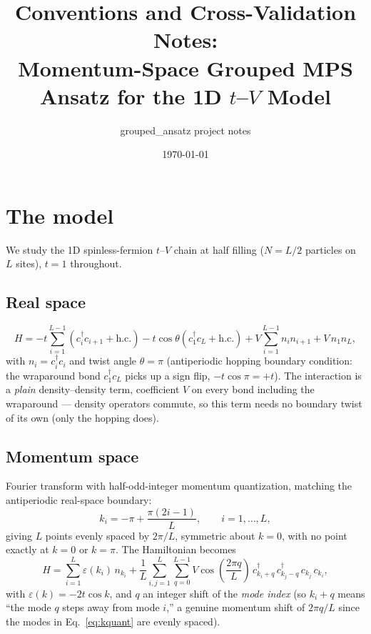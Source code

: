 \documentclass[11pt]{article}
\title{Conventions and Cross-Validation Notes:\\
Momentum-Space Grouped MPS Ansatz for the 1D $t$--$V$ Model}
\author{grouped\_ansatz project notes}
\date{\today}
\begin{document}
\maketitle

\section{The model}

We study the 1D spinless-fermion $t$--$V$ chain at half filling ($N=L/2$
particles on $L$ sites), $t=1$ throughout.

\subsection{Real space}

\begin{equation}
H = -t\sum_{i=1}^{L-1}\left(c_i^\dagger c_{i+1} + \mathrm{h.c.}\right)
    - t\cos\theta\left(c_1^\dagger c_L + \mathrm{h.c.}\right)
    + V\sum_{i=1}^{L-1} n_i n_{i+1}
    + V\, n_1 n_L,
\label{eq:Hreal}
\end{equation}
with $n_i = c_i^\dagger c_i$ and twist angle $\theta=\pi$ (antiperiodic
hopping boundary condition: the wraparound bond $c_1^\dagger c_L$ picks up a
sign flip, $-t\cos\pi = +t$). The interaction is a \emph{plain}
density--density term, coefficient $V$ on every bond including the
wraparound — density operators commute, so this term needs no boundary
twist of its own (only the hopping does).

\subsection{Momentum space}

Fourier transform with half-odd-integer momentum quantization, matching the
antiperiodic real-space boundary:
\begin{equation}
k_i = -\pi + \frac{\pi(2i-1)}{L}, \qquad i = 1,\dots,L,
\label{eq:kquant}
\end{equation}
giving $L$ points evenly spaced by $2\pi/L$, symmetric about $k=0$, with no
point exactly at $k=0$ or $k=\pi$. The Hamiltonian becomes
\begin{equation}
H = \sum_{i=1}^{L} \varepsilon(k_i)\, n_{k_i}
    + \frac{1}{L}\sum_{i,j=1}^{L}\sum_{q=0}^{L-1}
      V\cos\!\left(\frac{2\pi q}{L}\right)\,
      c^\dagger_{k_i+q}\, c^\dagger_{k_j-q}\, c_{k_j}\, c_{k_i},
\label{eq:Hmom}
\end{equation}
with $\varepsilon(k) = -2t\cos k$, and $q$ an integer shift of the
\emph{mode index} (so $k_i + q$ means ``the mode $q$ steps away from mode
$i$,'' a genuine momentum shift of $2\pi q/L$ since the modes in
Eq.~\eqref{eq:kquant} are evenly spaced).
\end{document}
